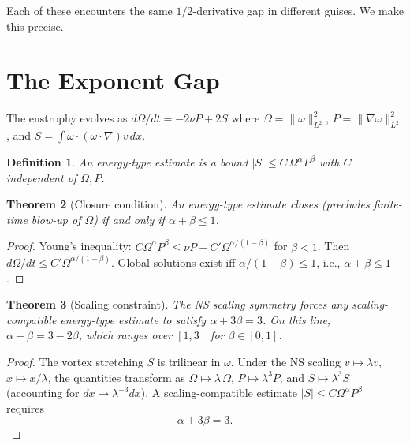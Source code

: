 \documentclass[12pt]{article}
\newtheorem{theorem}{Theorem}[section]
\newtheorem{definition}[theorem]{Definition}
\begin{document}
Each of these encounters the same $1/2$-derivative gap
in different guises. We make this precise.

\section{The Exponent Gap}

The enstrophy evolves as
$d\Omega/dt = -2\nu P + 2S$
where $\Omega = \|\omega\|_{L^2}^2$,
$P = \|\nabla\omega\|_{L^2}^2$, and
$S = \int \omega \cdot (\omega \cdot \nabla) v \, dx$.

\begin{definition}
An \emph{energy-type estimate} is a bound
$|S| \leq C \, \Omega^\alpha P^\beta$
with $C$ independent of $\Omega, P$.
\end{definition}

\begin{theorem}[Closure condition]\label{thm:closure}
An energy-type estimate closes (precludes finite-time
blow-up of $\Omega$) if and only if $\alpha + \beta \leq 1$.
\end{theorem}

\begin{proof}
Young's inequality:
$C\Omega^\alpha P^\beta \leq \nu P
+ C' \Omega^{\alpha/(1-\beta)}$ for $\beta < 1$.
Then $d\Omega/dt \leq C' \Omega^{\alpha/(1-\beta)}$.
Global solutions exist iff $\alpha/(1-\beta) \leq 1$,
i.e., $\alpha + \beta \leq 1$.
\end{proof}

\begin{theorem}[Scaling constraint]\label{thm:nogo}
The NS scaling symmetry forces any scaling-compatible
energy-type estimate to satisfy
$\alpha + 3\beta = 3$.
On this line, $\alpha + \beta = 3 - 2\beta$,
which ranges over $[1, 3]$ for $\beta \in [0, 1]$.
\end{theorem}

\begin{proof}
The vortex stretching $S$ is trilinear in $\omega$.
Under the NS scaling
$v \mapsto \lambda v$, $x \mapsto x/\lambda$,
the quantities transform as
$\Omega \mapsto \lambda \, \Omega$,
$P \mapsto \lambda^3 P$, and
$S \mapsto \lambda^3 S$
(accounting for $dx \mapsto \lambda^{-3} dx$).
A scaling-compatible estimate
$|S| \leq C \Omega^\alpha P^\beta$ requires
\begin{equation}\label{eq:scaling}
\alpha + 3\beta = 3.
\end{equation}
\end{proof}
\end{document}
